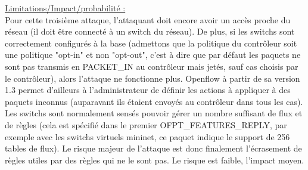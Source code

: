 \underline{Limitations/Impact/probabilité :}\\
Pour cette troisième attaque, l’attaquant doit encore avoir un accès proche du réseau (il doit être connecté à un switch du réseau). De plus, si les switchs sont correctement configurés à la base (admettons que la politique du contrôleur soit une politique "opt-in" et non "opt-out", c’est à dire que par défaut les paquets ne sont pas transmis en PACKET\_IN au contrôleur mais jetés, sauf cas choisis par le contrôleur), alors l’attaque ne fonctionne plus. Openflow à partir de sa version 1.3 permet d’ailleurs à l’administrateur de définir les actions à appliquer à des paquets inconnus (auparavant ils étaient envoyés au contrôleur dans tous les cas). Les switchs sont normalement sensés pouvoir gérer un nombre suffisant de flux et de règles (cela est spécifié dans le premier OFPT\_FEATURES\_REPLY, par exemple avec les switchs virtuels mininet, ce paquet indique le support de 256 tables de flux). Le risque majeur de l’attaque est donc finalement l’écrasement de règles utiles par des règles qui ne le sont pas. Le risque est faible, l’impact moyen.
